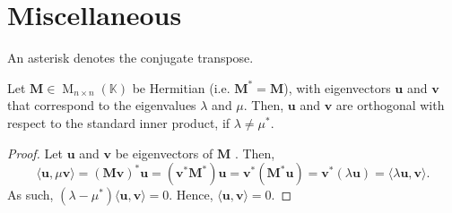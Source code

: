 \documentclass[../Notes.tex]{subfiles}
\begin{document}
\section{Miscellaneous}
An asterisk denotes the conjugate transpose.
\begin{theorem}{}{}
    Let \(\mathbf{M}\in \operatorname{M}_{n \times n}(\mathbb{K})\) be Hermitian (i.e. \(\mathbf{M}^{*}=\mathbf{M}\)), with eigenvectors \(\mathbf{u}\) and \(\mathbf{v}\) that correspond to the eigenvalues \(\lambda\) and \(\mu\). Then, \(\mathbf{u}\) and \(\mathbf{v}\) are orthogonal with respect to the standard inner product, if \(\lambda\neq\mu^{*}\). 
\end{theorem}
\begin{proof}
    Let \(\mathbf{u}\) and \(\mathbf{v}\) be eigenvectors of \(\mathbf{M}\) . Then, 
    \[\langle \mathbf{u},\mu\mathbf{v} \rangle=(\mathbf{M} \mathbf{v})^{*}\mathbf{u}=(\mathbf{v}^{*}\mathbf{M}^{*})\mathbf{u}=\mathbf{v}^{*}(\mathbf{M}^{*}\mathbf{u})=\mathbf{v}^{*}(\lambda \mathbf{u})=\langle \lambda \mathbf{u},\mathbf{v} \rangle.\]
    As such, \((\lambda-\mu^{*})\langle \mathbf{u},\mathbf{v} \rangle=0\). Hence, \(\langle \mathbf{u},\mathbf{v} \rangle=0\).
\end{proof}
    
\end{document}
